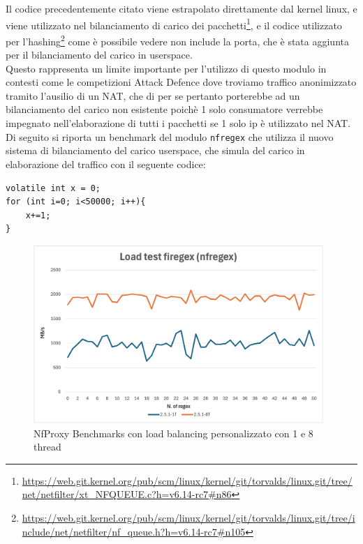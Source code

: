Il codice precedentemente citato viene estrapolato direttamente dal kernel linux, e 
viene utilizzato nel bilanciamento di carico dei pacchetti\footnote{\url{https://web.git.kernel.org/pub/scm/linux/kernel/git/torvalds/linux.git/tree/net/netfilter/xt_NFQUEUE.c?h=v6.14-rc7\#n86}},
e il codice utilizzato per l'hashing\footnote{\url{https://web.git.kernel.org/pub/scm/linux/kernel/git/torvalds/linux.git/tree/include/net/netfilter/nf_queue.h?h=v6.14-rc7\#n105}}
come è possibile vedere non include la porta, che è stata aggiunta per il bilanciamento del carico in userspace.\\

Questo rappresenta un limite importante per l'utilizzo di questo modulo in contesti come le competizioni Attack Defence dove
troviamo traffico anonimizzato tramito l'ausilio di un NAT, che di per se pertanto porterebbe
ad un bilanciamento del carico non esistente poichè 1 solo consumatore verrebbe impegnato nell'elaborazione di tutti i pacchetti
se 1 solo ip è utilizzato nel NAT.\\
Di seguito si riporta un benchmark del modulo \texttt{nfregex} che utilizza il nuovo sistema di bilanciamento del carico userspace,
che simula del carico in elaborazione del traffico con il seguente codice:

\begin{listing}[H]
    \begin{verbatim}
volatile int x = 0;
for (int i=0; i<50000; i++){
    x+=1;
}
\end{verbatim}
\end{listing}

\begin{figure}[H]
    \centering
    \includegraphics[width=0.98\textwidth]{images/chapter3/Benchmark-chart-with-load.png}
    \caption{NfProxy Benchmarks con load balancing personalizzato con 1 e 8 thread}
    \label{fig:nfproxy_multithread_benchmark}
\end{figure}

